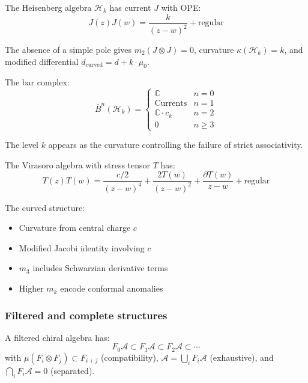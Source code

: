 \begin{example}
The Heisenberg algebra $\mathcal{H}_k$ has current $J$ with OPE:
\[J(z)J(w) = \frac{k}{(z-w)^2} + \text{regular}\]

The absence of a simple pole gives $m_2(J \otimes J) = 0$, curvature $\kappa(\mathcal{H}_k) = k$, and modified differential $d_{\text{curved}} = d + k \cdot \mu_0$.

The bar complex:
\[\bar{B}^n(\mathcal{H}_k) = \begin{cases}
\mathbb{C} & n = 0 \\
\text{Currents} & n = 1 \\
\mathbb{C} \cdot c_k & n = 2 \\
0 & n \geq 3
\end{cases}\]

The level $k$ appears as the curvature controlling the failure of strict associativity.
\end{example}

\begin{example}
The Virasoro algebra with stress tensor $T$ has:
\[T(z)T(w) = \frac{c/2}{(z-w)^4} + \frac{2T(w)}{(z-w)^2} + \frac{\partial T(w)}{z-w} + \text{regular}\]

The curved structure:
\begin{itemize}
\item Curvature from central charge $c$
\item Modified Jacobi identity involving $c$
\item $m_3$ includes Schwarzian derivative terms
\item Higher $m_k$ encode conformal anomalies
\end{itemize}
\end{example}

\subsubsection{Filtered and complete structures}

\begin{definition}\label{def:filtered-chiral-algebra}
A filtered chiral algebra has:
\[F_0\mathcal{A} \subset F_1\mathcal{A} \subset F_2\mathcal{A} \subset \cdots\]
with $\mu(F_i \otimes F_j) \subset F_{i+j}$ (compatibility), $\mathcal{A} = \bigcup_i F_i\mathcal{A}$ (exhaustive), and $\bigcap_i F_i\mathcal{A} = 0$ (separated).
\end{definition}

